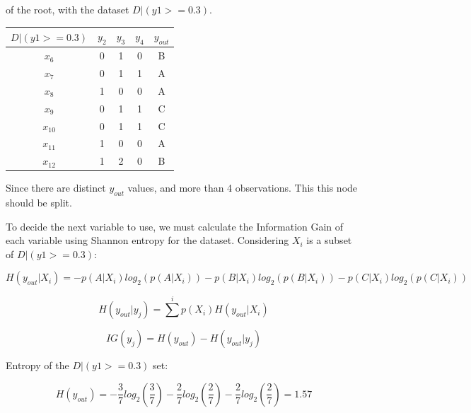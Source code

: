 \documentclass{article}
\begin{document}
\begin{enumerate}[leftmargin=\labelsep]
\begin{minipage}{0.6\textwidth}
  of the root, with the dataset $D | (y1 >= 0.3)$.
  \begin{table}[H]
    \centering
    \begin{tabular}{@{}ccccc}
      $D | (y1 >= 0.3)$ & $y_2$ & $y_3$ & $y_4$ & $y_{out}$ \\ \midrule
      $x_6$  & 0 & 1 & 0 & B \\
      $x_7$  & 0 & 1 & 1 & A \\
      $x_8$  & 1 & 0 & 0 & A \\
      $x_9$  & 0 & 1 & 1 & C \\
      $x_{10}$ & 0 & 1 & 1 & C \\
      $x_{11}$ & 1 & 0 & 0 & A \\
      $x_{12}$ & 1 & 2 & 0 & B \\
    \end{tabular}
  \end{table}

  Since there are distinct $y_{out}$ values, and more 
  than 4 observations. This this node should be split.
\end{minipage}
\vspace{3pt}
 
To decide the next variable to use, we must calculate 
the Information Gain of each variable using Shannon 
entropy for the dataset.
Considering $X_i$ is a subset of $D | (y1 >= 0.3)$:


\begin{equation*}
  H(y_{out}|X_i) = -p(A|X_i)log_2(p(A|X_i))-p(B|X_i)log_2(p(B|X_i))-p(C|X_i)log_2(p(C|X_i))
\end{equation*}

\begin{equation*}
  H(y_{out}|y_j) = \sum^{i}p(X_i) H(y_{out}|X_i)
\end{equation*}

\begin{equation*}
  IG(y_j) = H(y_{out}) - H(y_{out}|y_j)
\end{equation*}

Entropy of the $D | (y1 >= 0.3)$ set:

\begin{equation*}
  H(y_{out}) = -\frac{3}{7}log_2(\frac{3}{7})-\frac{2}{7}log_2(\frac{2}{7})-\frac{2}{7}log_2(\frac{2}{7}) = 1.57
\end{equation*}


\end{enumerate}
\end{document}
